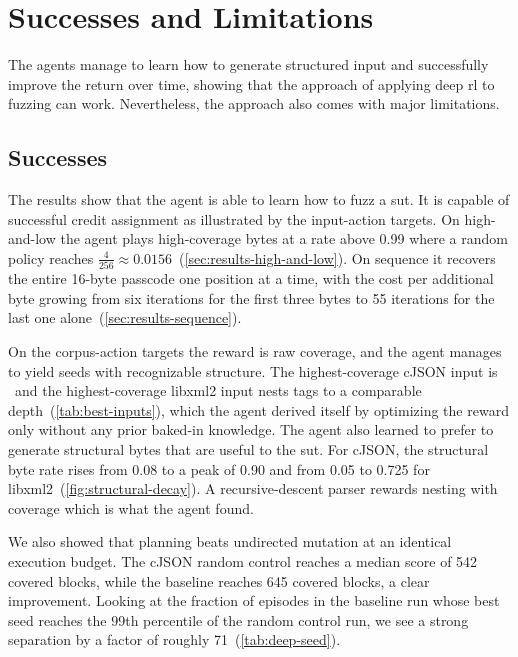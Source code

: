 
\section{Successes and Limitations}\label{sec:discussion-interpretation}

The agents manage to learn how to generate structured input and successfully
improve the return over time, showing that the approach of applying deep \gls{rl} to fuzzing can work.
Nevertheless, the approach also comes with major limitations.

\subsection{Successes}

The results show that the agent is able to learn how to fuzz a \gls{sut}.
It is capable of successful credit assignment as illustrated by the input-action targets.
On high-and-low the agent plays high-coverage bytes at a rate above \num{0.99} where a random
policy reaches $\frac{4}{256}\approx\num{0.0156}$~(\cref{sec:results-high-and-low}).
On sequence it recovers the entire 16-byte passcode one position at a time,
with the cost per additional byte growing from six iterations for the first
three bytes to 55 iterations for the last one
alone~(\cref{sec:results-sequence}).

On the corpus-action targets the reward is raw coverage, and the agent manages to yield seeds with
recognizable structure.
The highest-coverage cJSON input is \code{[[[[[2,[[[[[1\ldots}\ and the highest-coverage libxml2
input nests tags to a comparable depth~(\cref{tab:best-inputs}), which the agent derived
itself by optimizing the reward only without any prior baked-in knowledge.
The agent also learned to prefer to generate structural bytes that are useful to the \gls{sut}.
For cJSON, the structural byte rate rises from \num{0.08} to a peak of \num{0.90} and
from \num{0.05} to \num{0.725} for libxml2~(\cref{fig:structural-decay}).
A recursive-descent parser rewards nesting with coverage which is what the agent found.

We also showed that planning beats undirected mutation at an identical execution budget.
The cJSON random control reaches a median score of \num{542} covered blocks,
while the baseline reaches \num{645} covered blocks, a clear improvement.
Looking at the fraction of episodes in the baseline run whose best seed reaches the 99th percentile
of the random control run, we see a strong separation by a factor of roughly \num{71}~(\cref{tab:deep-seed}).


